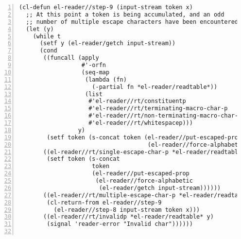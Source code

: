 \documentclass[a4paper,10pt,twoside]{report}
\begin{document}
\begin{lstlisting}[style=lispcode,label={code:read-algo},caption={Code for the
    reader algorithm.},numbers=left]
(cl-defun el-reader//step-9 (input-stream token x)
  ;; At this point a token is being accumulated, and an odd
  ;; number of multiple escape characters have been encountered.
  (let (y)
    (while t
      (setf y (el-reader/getch input-stream))
      (cond
       ((funcall (apply
                  #'-orfn
                  (seq-map
                   (lambda (fn)
                     (-partial fn *el-reader/readtable*))
                   (list
                    #'el-reader//rt/constituentp
                    #'el-reader//rt/terminating-macro-char-p
                    #'el-reader//rt/non-terminating-macro-char-p
                    #'el-reader//rt/whitespacep)))
                 y)
        (setf token (s-concat token (el-reader//put-escaped-prop
                                     (el-reader//force-alphabetic y)))))
       ((el-reader//rt/single-escape-char-p *el-reader/readtable* y)
        (setf token (s-concat
                     token
                     (el-reader//put-escaped-prop
                      (el-reader//force-alphabetic
                       (el-reader/getch input-stream))))))
       ((el-reader//rt/multiple-escape-char-p *el-reader/readtable* y)
        (cl-return-from el-reader//step-9
          (el-reader//step-8 input-stream token x)))
       ((el-reader//rt/invalidp *el-reader/readtable* y)
        (signal 'reader-error "Invalid char"))))))


\end{lstlisting}
\end{document}
